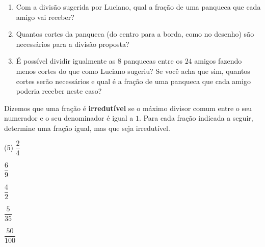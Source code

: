 \begin{atividade}{}
\begin{center}
\end{center}

\begin{enumerate}  %
  \item     Com a divisão sugerida por Luciano, qual a fração de uma panqueca que cada amigo vai receber?
  \item     Quantos cortes da panqueca (do centro para a borda, como no desenho) são necessários para a divisão proposta?
  \item     É possível dividir igualmente as     $8$ panquecas entre os     $24$ amigos fazendo menos cortes do que como Luciano sugeriu? Se você acha que sim, quantos cortes serão necessários e qual é a fração de uma panqueca que cada amigo poderia receber neste caso?
\end{enumerate} %
\end{atividade}

\begin{atividade}{}\label{chap4-ativ17}

Dizemos que uma fração é {\bfseries irredutível} se o máximo divisor comum entre o seu numerador e o seu denominador é igual a $1$. Para cada fração indicada a seguir, determine uma fração igual, mas que seja irredutível.
\vspace{.2cm}

\begin{tasks}(5)
\task $\dfrac{2}{4}$

\task $\dfrac{6}{9}$

\task $\dfrac{4}{2}$

\task $\dfrac{5}{35}$

\task $\dfrac{50}{100}$
\end{tasks}
\end{atividade}

